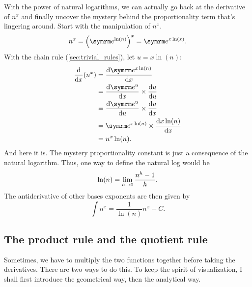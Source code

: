With the power of natural logarithms, we can actually go back at the derivative of $n^x$ and finally uncover the mystery behind the proportionality term that's lingering around. Start with the manipulation of $n^x$.
\begin{equation}
    n^x = \left(\e^{\ln(n)}\right)^x = \e^{x\ln(x)}.
\end{equation}
With the chain rule (\cref{sec:trivial_rules}), let $u = x\ln(n)$:
\begin{align*}
    \odv*{(n^x)}{x} &= \odv{\e^{x\ln(n)}}{x} \\
    &= \odv{\e^u}{x} \times \odv{u}{u} \\
    &= \odv{\e^u}{u} \times \odv{u}{x} \\
    &= \e^{x\ln(n)} \times \odv{x\ln(n)}{x} \\
    &= n^x\ln(n).
\end{align*}
And here it is. The mystery proportionality constant is just a consequence of the natural logarithm. Thus, one way to define the natural log would be
\begin{equation}
    \ln(n) = \lim_{h \rightarrow 0}\frac{n^h - 1}{h}.
\end{equation}
The antiderivative of other bases exponents are then given by
\begin{equation}
    \int n^x = \frac{1}{\ln(n)}n^x + C.
\end{equation}

\subsection{The product rule and the quotient rule}

Sometimes, we have to multiply the two functions together before taking the derivatives. There are two ways to do this. To keep the spirit of visualization, I shall first introduce the geometrical way, then the analytical way.

